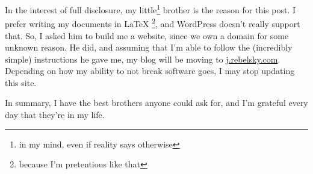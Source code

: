 \documentclass[12pt]{article}[titlepage]
\newcommand{\1}{\={a}}
\newcommand{\2}{\={e}}
\newcommand{\3}{\={\i}}
\newcommand{\4}{\=o}
\newcommand{\5}{\=u}
\newcommand{\6}{\={A}}
\renewcommand{\,}{\textsuperscript{,}}
\begin{document}
In the interest of full disclosure, my little\footnote{in my mind, even if reality says otherwise} brother is the reason for this post. I prefer writing my documents in LaTeX \footnote{because I'm pretentious like that}, and WordPress doesn't really support that. So, I asked him to build me a website, since we own a domain for some unknown reason. He did, and assuming that I'm able to follow the (incredibly simple) instructions he gave me, my blog will be moving to \href{http://j.rebelsky.com}{j.rebelsky.com}. Depending on how my ability to not break software goes, I may stop updating this site.

In summary, I have the best brothers anyone could ask for, and I'm grateful every day that they're in my life.
\end{document}
